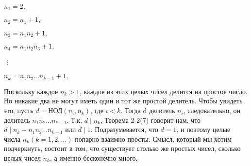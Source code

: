 \documentclass[11pt]{article}
\begin{document}
	\begin{trivlist}


\item\hspace*{70mm}	$n_{1} = 2,$
\item \hspace*{71mm}$n_{2} = n_{1} + 1,$
\item \hspace*{71mm}$n_{3} = n_{1}n_{2} + 1,$
\item \hspace*{71mm}$n_{4} = n_{1}n_{2}n_{3} + 1,$
\item \hspace*{73mm}\vdots
\item \hspace*{71mm}$n_{k} = n_{1}n_{2}...n_{k-1} + 1,$

	\end{trivlist}
Поскольку каждое $n_{k}> 1$, каждое из этих целых чисел делится на простое число. Но никакие два не могут иметь один и тот же простой делитель. Чтобы увидеть это, пусть $d = \text{НОД} (n_{i},n_{k})$, где $i<k$. Тогда d делитель $n_{i}$, следовательно, он делитель $n_{1}n_{2}...n_{k-1}$. Т.к. $d\mid n_{k}$, Теорема 2-2(7) говорит нам, что $d\mid n_{k}-n_{1}n_{2}...n_{k-1}$ или $d \mid 1$. Подразумевается, что $d = 1$, и поэтому целые числа $n_{k}(k = 1,2,...)$ попарно взаимно просты. Смысл, который мы хотим подчеркнуть, состоит в том, что существует столько же простых чисел, сколько целых чисел $n_{k}$, а именно бесконечно много.
\end{document}
